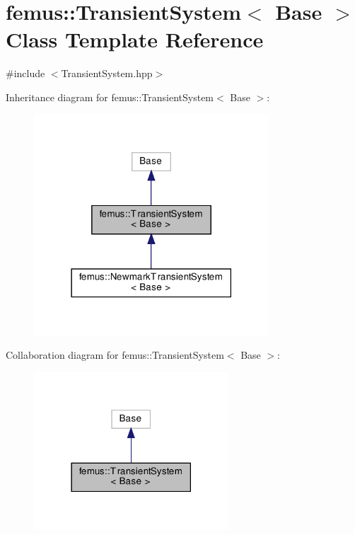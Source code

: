 \hypertarget{classfemus_1_1_transient_system}{}\section{femus\+:\+:Transient\+System$<$ Base $>$ Class Template Reference}
\label{classfemus_1_1_transient_system}


{\ttfamily \#include $<$Transient\+System.\+hpp$>$}



Inheritance diagram for femus\+:\+:Transient\+System$<$ Base $>$\+:
\nopagebreak
\begin{figure}[H]
\begin{center}
\leavevmode
\includegraphics[width=249pt]{classfemus_1_1_transient_system__inherit__graph}
\end{center}
\end{figure}


Collaboration diagram for femus\+:\+:Transient\+System$<$ Base $>$\+:
\nopagebreak
\begin{figure}[H]
\begin{center}
\leavevmode
\includegraphics[width=206pt]{classfemus_1_1_transient_system__coll__graph}
\end{center}
\end{figure}
